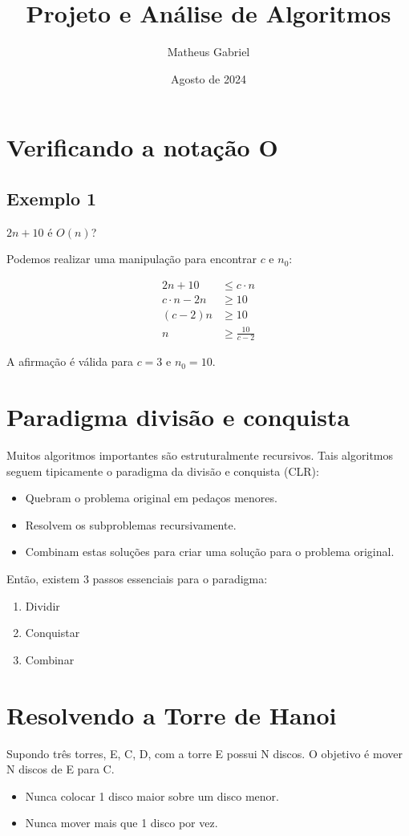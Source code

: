 \documentclass{article}
\title{Projeto e Análise de Algoritmos}
\author{Matheus Gabriel}
\date{Agosto de 2024}
\begin{document}
\maketitle

\section{Verificando a notação O}

\subsection{Exemplo 1}

$2n + 10$ é $O(n)$? 

Podemos realizar uma manipulação para encontrar $c$ e $n_0$:

\begin{align}
    2n + 10 &\leq c \cdot n \\
    c \cdot n - 2n &\geq 10 \\
    (c - 2)n &\geq 10 \\
    n &\geq \frac{10}{c - 2}
\end{align}

A afirmação é válida para $c = 3$ e  $n_0 = 10$.

\section{Paradigma divisão e conquista}

Muitos algoritmos importantes são estruturalmente recursivos. Tais algoritmos seguem tipicamente o paradigma da divisão e conquista (CLR):
\begin{itemize}
    \item Quebram o problema original em pedaços menores.
    \item Resolvem os subproblemas recursivamente.
    \item Combinam estas soluções para criar uma solução para o problema original.
\end{itemize}

Então, existem 3 passos essenciais para o paradigma: 
\begin{enumerate}
    \item Dividir
    \item Conquistar
    \item Combinar
\end{enumerate}

\section{Resolvendo a Torre de Hanoi}
Supondo três torres, E, C, D, com a torre E possui N discos.
O objetivo é mover N discos de E para C.

\begin{itemize}
    \item Nunca colocar 1 disco maior sobre um disco menor.
    \item Nunca mover mais que 1 disco por vez.
\end{itemize}
\end{document}
